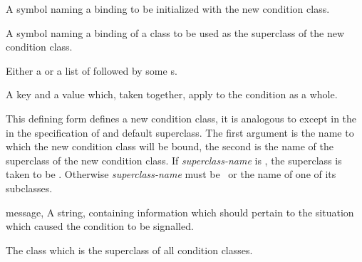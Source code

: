 \begin{optDefinition}
%
\label{defcondition}
%
\Syntax
\label{defcondition-syntax}
%
%
\begin{arguments}
    \item[\scref{condition-class-name}] A symbol naming a binding to be
    initialized with the new condition class.

    \item[\scref{condition-superclass-name}] A symbol naming a binding of a
    class to be used as the superclass of the new condition class.

    \item[\scref{slot}] Either a  or a list of
     followed by some s.

    \item[\scref{class-option}] A key and a value which, taken together, apply
    to the condition as a whole.
\end{arguments}
%
\remarks%
This defining form defines a new condition class, it is analogous to
 except in the in the specification of and default
superclass.  The first argument is the name to which the new condition class
will be bound, the second is the name of the superclass of the new condition
class.  If {\em superclass-name\/} is \nil{}, the superclass is taken to be
.  Otherwise {\em superclass-name\/} must be
\ or the name of one of its subclasses.

\label{\conditionlabel{condition}}
%
\begin{initoptions}
    \item[message, \classref{string}] A string, containing information which
    should pertain to the situation which caused the condition to be signalled.
\end{initoptions}
%
\remarks%
The class which is the superclass of all condition classes.


\end{optDefinition}
